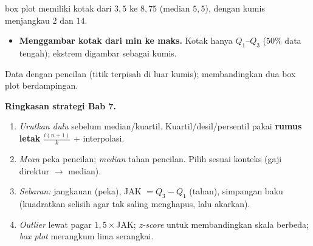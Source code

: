 \begin{center}
\end{center}
\jadi box plot memiliki kotak dari $3{,}5$ ke $8{,}75$ (median $5{,}5$), dengan
kumis menjangkau $2$ dan $14$.

\begin{jebakan}
\begin{itemize}[leftmargin=*,topsep=2pt]
  \item \textbf{Menggambar kotak dari min ke maks.} Kotak hanya $Q_1$--$Q_3$
  ($50\%$ data tengah); ekstrem digambar sebagai kumis.
\end{itemize}
\end{jebakan}

\begin{variasi}
Data dengan pencilan (titik terpisah di luar kumis); membandingkan dua box plot
berdampingan.
\end{variasi}

\begin{tips}
\textbf{Ringkasan strategi Bab 7.}
\begin{enumerate}[leftmargin=*,topsep=2pt]
  \item \emph{Urutkan dulu} sebelum median/kuartil. Kuartil/desil/persentil pakai
  \textbf{rumus letak} $\frac{i(n+1)}{k}$ + interpolasi.
  \item \emph{Mean} peka pencilan; \emph{median} tahan pencilan. Pilih sesuai
  konteks (gaji direktur $\to$ median).
  \item \emph{Sebaran:} jangkauan (peka), JAK $=Q_3-Q_1$ (tahan), simpangan baku
  (kuadratkan selisih agar tak saling menghapus, lalu akarkan).
  \item \emph{Outlier} lewat pagar $1{,}5\times$JAK; \emph{z-score} untuk
  membandingkan skala berbeda; \emph{box plot} merangkum lima serangkai.
\end{enumerate}
\end{tips}


